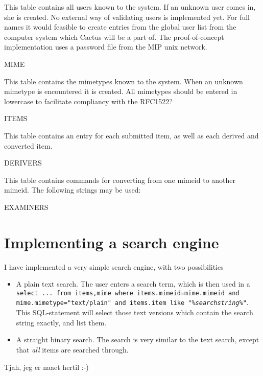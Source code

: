 This table contains all users known to the system.  If an unknown user comes in, she is created.  No external way of validating users is implemented yet.  For full names it would feasible to create entries from the global user list from the computer system which Cactus will be a part of.  The proof-of-concept implementation uses a password file from the MIP unix network.



MIME

This table contains the mimetypes known to the system.  When an unknown mimetype is encountered it is created.   All mimetypes should be entered in lowercase to facilitate compliancy with the RFC\textsf{1522}?

ITEMS

This table contains an entry for each submitted item, as well as each derived and converted item.  

DERIVERS

This table contains commands for converting from one mimeid to another mimeid.  The following strings may be used:


EXAMINERS



\section{Implementing a search engine}

I have implemented a very simple search engine, with two possibilities

\begin{itemize}
\item A plain text search.  The user enters a search term, which is then used in a \texttt{select ... from items,mime where items.mimeid=mime.mimeid and mime.mimetype="text/plain" and items.item like "\%\textit{searchstring}\%"}.  This SQL-statement will select those text versions which contain the search string exactly, and list them.

\item A straight binary search.  The search is very similar to the text search, except that \textit{all} items are searched through.

\end{itemize}



\textsf{Tjah, jeg er naaet hertil :-)}




